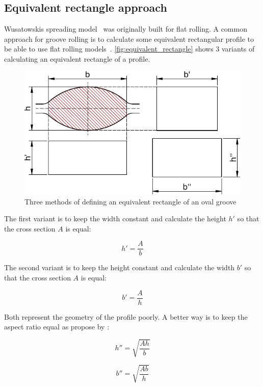 \documentclass[11pt]{PyRollDocs}
\begin{document}
    \subsection{Equivalent rectangle approach}\label{subsec:equivalent-rectangle-approach}

    Wusatowskis spreading model~\cite{Wusatowski1969} was originally built for flat rolling.
    A common approach for groove rolling is to calculate some equivalent rectangular profile to be able to use flat rolling models~\cite{Hensel1978, Spittel1984}.
    \autoref{fig:equivalent_rectangle} shows 3 variants of calculating an equivalent rectangle of a profile.

    \begin{figure}
        \centering
        \includegraphics[width=\linewidth]{equivalent_rectangle}
        \caption{Three methods of defining an equivalent rectangle of an oval groove}
        \label{fig:equivalent_rectangle}
    \end{figure}

    The first variant is to keep the width constant and calculate the height $h'$ so that the cross section $A$ is
    equal:

    \[
        h' = \frac{A}{b}
    \]

    The second variant is to keep the height constant and calculate the width $b'$ so that the cross section $A$ is
    equal:

    \[
        b' = \frac{A}{h}
    \]

    Both represent the geometry of the profile poorly.
    A better way is to keep the aspect ratio equal as propose by \textcite{Spittel1984}:

    \[
        h'' = \sqrt{\frac{A h}{b}}
    \]

    \[
        b'' = \sqrt{\frac{A b}{h}}
    \]
\end{document}

